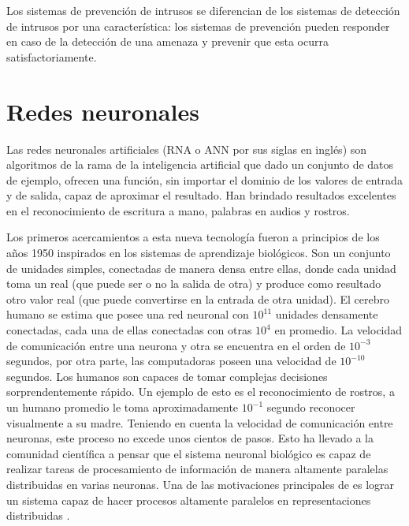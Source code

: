Los sistemas de prevención de intrusos se diferencian de los sistemas de detección de intrusos por una característica: los sistemas de prevención pueden responder en caso de la detección de una amenaza y prevenir que esta ocurra satisfactoriamente.

\section{Redes neuronales}

Las redes neuronales artificiales (RNA o ANN por sus siglas en inglés) son algoritmos de la rama de la inteligencia artificial que dado un conjunto de datos de ejemplo, ofrecen una función, sin importar el dominio de los valores de entrada y de salida, capaz de aproximar el resultado. Han brindado resultados excelentes en el reconocimiento de escritura a mano, palabras en audios y rostros.

Los primeros acercamientos a esta nueva tecnología fueron a principios de los a\~nos 1950 inspirados en los sistemas de aprendizaje biológicos. Son un conjunto de unidades simples, conectadas de manera densa entre ellas, donde cada unidad toma un real (que puede ser o no la salida de otra) y produce como resultado otro valor real (que puede convertirse en la entrada de otra unidad). El cerebro humano se estima que posee una red neuronal con $10^{11}$ unidades densamente conectadas, cada una de ellas conectadas con otras $10^{4}$ en promedio. La velocidad de comunicación entre una neurona y otra se encuentra en el orden de $10^{-3}$ segundos, por otra parte, las computadoras poseen una velocidad de $10^{-10}$ segundos. Los humanos son capaces de tomar complejas decisiones sorprendentemente rápido. Un ejemplo de esto es el reconocimiento de rostros, a un humano promedio le toma aproximadamente $10^{-1}$ segundo reconocer visualmente a su madre. Teniendo en cuenta la velocidad de comunicación entre neuronas, este proceso no excede unos cientos de pasos. Esto ha llevado a la comunidad científica a pensar que el sistema neuronal biológico es capaz de realizar tareas de procesamiento de información de manera altamente paralelas distribuidas en varias neuronas. Una de las motivaciones principales de es lograr un sistema capaz de hacer procesos altamente paralelos en representaciones distribuidas \cite{brown1990learning,churchland1992computational,mitchell1997machine}.

